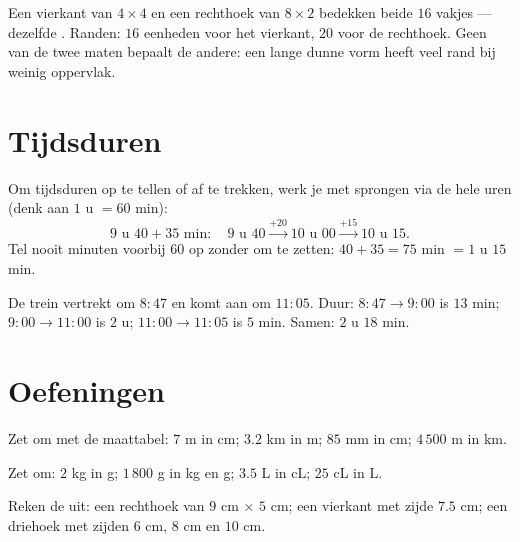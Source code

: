 \begin{example}\label{ex:g4:measure:samearea}
Een vierkant van $4 \times 4$ en een rechthoek van $8 \times 2$ bedekken
beide $16$ vakjes --- dezelfde . Randen: $16$ eenheden voor het
vierkant, $20$ voor de rechthoek. Geen van de twee maten bepaalt de andere:
een lange dunne vorm heeft veel rand bij weinig oppervlak.
\end{example}

\section{Tijdsduren}

\begin{method}\label{met:g4:measure:time}
Om tijdsduren op te tellen of af te trekken, werk je met sprongen via de
hele uren (denk aan $1$ u $= 60$ min):
\[
9\text{ u }40 + 35 \text{ min}:
\quad 9\text{ u }40 \xrightarrow{+20} 10\text{ u }00
\xrightarrow{+15} 10\text{ u }15 .
\]
Tel nooit minuten voorbij $60$ op zonder om te zetten: $40 + 35 = 75$ min
$= 1$ u $15$ min.
\end{method}

\begin{example}\label{ex:g4:measure:timetable}
De trein vertrekt om $8{:}47$ en komt aan om $11{:}05$. Duur:
$8{:}47 \to 9{:}00$ is $13$ min; $9{:}00 \to 11{:}00$ is $2$ u;
$11{:}00 \to 11{:}05$ is $5$ min. Samen: $2$ u $18$ min.
\end{example}

\section{Oefeningen}

\begin{exercise}[$\star$]\label{exo:g4:measure:1}
Zet om met de maattabel: $7$ m in cm; $3.2$ km in m; $85$ mm in cm;
$4\,500$ m in km.
\end{exercise}

\begin{exercise}[$\star$]\label{exo:g4:measure:2}
Zet om: $2$ kg in g; $1\,800$ g in kg en g; $3.5$ L in cL; $25$ cL in L.
\end{exercise}

\begin{exercise}[$\star$]\label{exo:g4:measure:3}
Reken de  uit: een rechthoek van $9$ cm $\times$ $5$ cm; een vierkant
met zijde $7.5$ cm; een driehoek met zijden $6$ cm, $8$ cm en $10$ cm.
\end{exercise}

